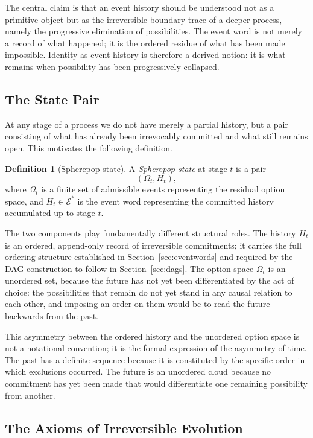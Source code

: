 \documentclass[12pt]{article}
\theoremstyle{plain}
\theoremstyle{definition}
\newtheorem{definition}[theorem]{Definition}
\theoremstyle{remark}
\begin{document}
The central claim is that an event history should be understood not as a
primitive object but as the irreversible boundary trace of a deeper process,
namely the progressive elimination of possibilities.  The event word is not
merely a record of what happened; it is the ordered residue of what has been
made impossible.  Identity as event history is therefore a derived notion: it
is what remains when possibility has been progressively collapsed.

\subsection{The State Pair}

At any stage of a process we do not have merely a partial history, but a pair
consisting of what has already been irrevocably committed and what still remains
open.  This motivates the following definition.

\begin{definition}[Spherepop state]
\label{def:statepair}
A \emph{Spherepop state} at stage $t$ is a pair
\[
  (\Omega_t, H_t),
\]
where $\Omega_t$ is a finite set of admissible events representing the residual
option space, and $H_t \in \mathcal{E}^{*}$ is the event word representing the
committed history accumulated up to stage $t$.
\end{definition}

The two components play fundamentally different structural roles.  The history
$H_t$ is an ordered, append-only record of irreversible commitments; it carries
the full ordering structure established in Section~\ref{sec:eventwords} and
required by the DAG construction to follow in Section~\ref{sec:dags}.  The
option space $\Omega_t$ is an unordered set, because the future has not yet
been differentiated by the act of choice: the possibilities that remain do not
yet stand in any causal relation to each other, and imposing an order on them
would be to read the future backwards from the past.

This asymmetry between the ordered history and the unordered option space is
not a notational convention; it is the formal expression of the asymmetry of
time.  The past has a definite sequence because it is constituted by the
specific order in which exclusions occurred.  The future is an unordered cloud
because no commitment has yet been made that would differentiate one remaining
possibility from another.

\subsection{The Axioms of Irreversible Evolution}
\end{document}
